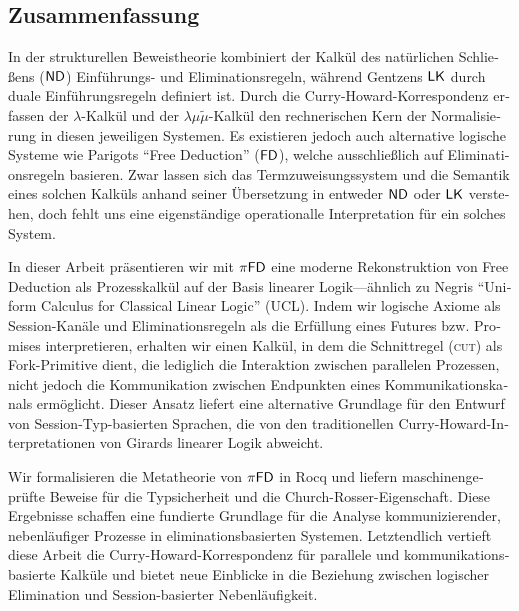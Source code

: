 \begin{otherlanguage}{ngerman}
\begingroup
\let\clearpage\relax
\let\cleardoublepage\relax
\let\cleardoublepage\relax

\chapter*{Zusammenfassung}
In der strukturellen Beweistheorie kombiniert der Kalkül des natürlichen
Schließens ($\textsf{ND}$) Einführungs- und Eliminationsregeln, während Gentzens
$\textsf{LK}$ durch duale Einführungsregeln definiert ist.
Durch die Curry-Howard-Korrespondenz erfassen der $\lambda$-Kalkül
und der $\lambda\mu\tilde{\mu}$-Kalkül den rechnerischen Kern der Normalisierung
in diesen jeweiligen Systemen. Es existieren jedoch auch alternative logische Systeme
wie Parigots \enquote{Free Deduction} ($\textsf{FD}$), welche
ausschließlich auf Eliminationsregeln basieren.
Zwar lassen sich das Termzuweisungssystem und die Semantik eines solchen Kalküls
anhand seiner Übersetzung in entweder $\textsf{ND}$ oder $\textsf{LK}$ verstehen, doch fehlt
uns eine eigenständige operationalle Interpretation für
ein solches System.

In dieser Arbeit präsentieren wir mit $\pi\textsf{FD}$ eine moderne Rekonstruktion von Free Deduction
als Prozesskalkül auf der Basis linearer Logik---ähnlich zu Negris
\enquote{Uniform Calculus for Classical Linear Logic} (UCL).
Indem wir logische Axiome als Session-Kanäle und Eliminationsregeln
als die Erfüllung eines Futures bzw. Promises interpretieren,
erhalten wir einen Kalkül, in dem die Schnittregel (\textsc{cut}) als
Fork-Primitive dient, die lediglich die Interaktion zwischen parallelen Prozessen,
nicht jedoch die Kommunikation zwischen Endpunkten eines Kommunikationskanals ermöglicht.
Dieser Ansatz liefert eine alternative Grundlage für den Entwurf von
Session-Typ-basierten Sprachen, die von den traditionellen
Curry-Howard-Interpretationen von Girards linearer Logik abweicht.

Wir formalisieren die Metatheorie von $\pi\textsf{FD}$ in Rocq und liefern maschinengeprüfte
Beweise für die Typsicherheit und die Church-Rosser-Eigenschaft.
Diese Ergebnisse schaffen eine fundierte Grundlage für die Analyse
kommunizierender, nebenläufiger Prozesse in eliminationsbasierten Systemen.
Letztendlich vertieft diese Arbeit die Curry-Howard-Korrespondenz für
parallele und kommunikationsbasierte Kalküle und bietet neue Einblicke
in die Beziehung zwischen logischer Elimination und Session-basierter
Nebenläufigkeit.

\end{otherlanguage}

\endgroup

\vfill